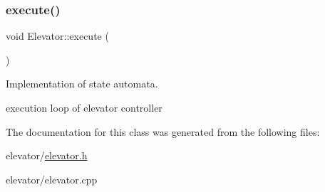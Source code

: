 \subsubsection{\texorpdfstring{execute()}{execute()}}
{\footnotesize\ttfamily void Elevator\+::execute (\begin{DoxyParamCaption}{ }\end{DoxyParamCaption})}



Implementation of state automata. 

execution loop of elevator controller 

The documentation for this class was generated from the following files\+:\begin{DoxyCompactItemize}
\item 
elevator/\hyperlink{elevator_8h}{elevator.\+h}\item 
elevator/elevator.\+cpp\end{DoxyCompactItemize}
